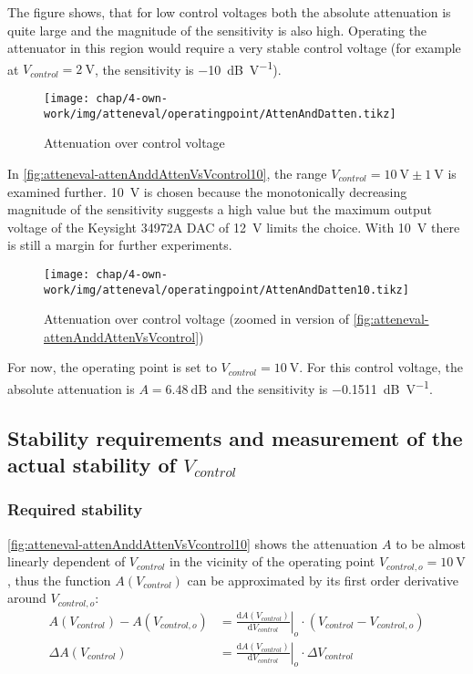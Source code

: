 The figure shows, that for low control voltages both the absolute attenuation is quite large and the magnitude of the sensitivity is also high. Operating the attenuator in this region would require a very stable control voltage (for example at $V_{control}=\SI{2}{\volt}$, the sensitivity is \SI{-10}{\dB\per\volt}).

\begin{figure}[tb]
	\centering
	\texttt{[image: chap/4-own-work/img/atteneval/operatingpoint/AttenAndDatten.tikz]}
	\caption{Attenuation over control voltage}
	\label{fig:atteneval-attenAnddAttenVsVcontrol}
\end{figure}

In \autoref{fig:atteneval-attenAnddAttenVsVcontrol10}, the range $V_{control}=\SI{10}{\volt}\pm\SI{1}{\volt}$ is examined further. \SI{10}{\volt} is chosen because the monotonically decreasing magnitude of the sensitivity suggests a high value but the maximum output voltage of the Keysight 34972A DAC of \SI{12}{\volt} limits the choice. With \SI{10}{\volt} there is still a margin for further experiments.

\begin{figure}[tb]
	\centering
	\texttt{[image: chap/4-own-work/img/atteneval/operatingpoint/AttenAndDatten10.tikz]}
	\caption{Attenuation over control voltage (zoomed in version of \autoref{fig:atteneval-attenAnddAttenVsVcontrol})}
	\label{fig:atteneval-attenAnddAttenVsVcontrol10}
\end{figure}

For now, the operating point is set to $V_{control}=\SI{10}{\volt}$. For this control voltage, the absolute attenuation is $A=\SI{6.48}{\dB}$ and the sensitivity is \SI{-0.1511}{\dB\per\volt}.

\FloatBarrier
\newpage
\subsection{Stability requirements and measurement of the actual stability of $V_{control}$}
\subsubsection{Required stability}
\autoref{fig:atteneval-attenAnddAttenVsVcontrol10} shows the attenuation $A$ to be almost linearly dependent of $V_{control}$ in the vicinity of the operating point $V_{control,o}=\SI{10}{\volt}$, thus the function $A(V_{control})$ can be approximated by its first order derivative around $V_{control,o}$:
\begin{align}
A(V_{control}) - A(V_{control,o}) &= \left.\frac{\text{d}A(V_{control})}{\text{d}V_{control}}\right|_{o} \cdot 
\left( V_{control} - V_{control,o}\right)\\
\Delta A(V_{control}) &= \left.\frac{\text{d}A(V_{control})}{\text{d}V_{control}}\right|_{o} \cdot \Delta V_{control}
\end{align}

